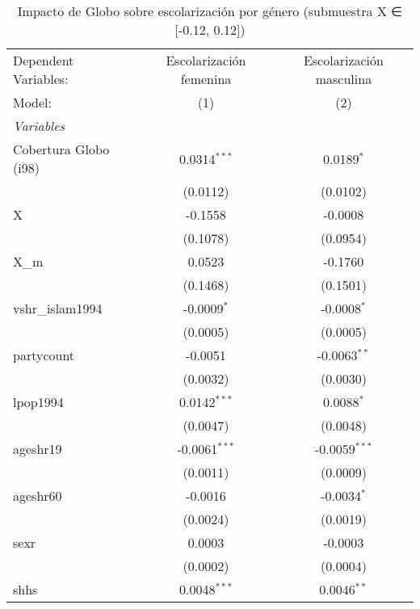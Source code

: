 
\begin{table}[htbp]
   \caption{Impacto de Globo sobre escolarización por género (submuestra X ∈ [-0.12, 0.12])}
   \centering
   \begin{tabular}{lcc}
      \tabularnewline \midrule \midrule
      Dependent Variables:  & Escolarización femenina & Escolarización masculina\\  
      Model:                & (1)                     & (2)\\  
      \midrule
      \emph{Variables}\\
      Cobertura Globo (i98) & 0.0314$^{***}$          & 0.0189$^{*}$\\   
                            & (0.0112)                & (0.0102)\\   
      X                     & -0.1558                 & -0.0008\\   
                            & (0.1078)                & (0.0954)\\   
      X\_m                  & 0.0523                  & -0.1760\\   
                            & (0.1468)                & (0.1501)\\   
      vshr\_islam1994       & -0.0009$^{*}$           & -0.0008$^{*}$\\   
                            & (0.0005)                & (0.0005)\\   
      partycount            & -0.0051                 & -0.0063$^{**}$\\   
                            & (0.0032)                & (0.0030)\\   
      lpop1994              & 0.0142$^{***}$          & 0.0088$^{*}$\\   
                            & (0.0047)                & (0.0048)\\   
      ageshr19              & -0.0061$^{***}$         & -0.0059$^{***}$\\   
                            & (0.0011)                & (0.0009)\\   
      ageshr60              & -0.0016                 & -0.0034$^{*}$\\   
                            & (0.0024)                & (0.0019)\\   
      sexr                  & 0.0003                  & -0.0003\\   
                            & (0.0002)                & (0.0004)\\   
      shhs                  & 0.0048$^{***}$          & 0.0046$^{**}$\\   

\end{tabular}
\end{table}
